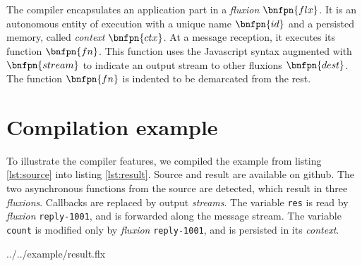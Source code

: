 \vspace{-1\baselineskip}
\begin{bnf*}
      { \bnfor {} \bnfsp {} \bnfsp {}}\\
      { \bnfsp {} \bnfsp {} \bnfsp {} \bnfsp {} \bnfsp {} \bnfsp {}}\\
      { \bnfor {} \bnfor {} \bnfsp {} \bnfsp {}}\\
       { \bnfsp {} }\\
         {}\\
          {\bnfts{\texttt{\{}}  \bnfts{\texttt{\}}}}\\
          {\bnfts{\texttt{[}}  \bnfts{\texttt{]}}}\\
         { \bnfor {} \bnfsp \bnfts{,} \bnfsp {}}\\
           {\bnfts{\texttt{>}\texttt{>}} \bnfor \bnfts{\texttt{-}\texttt{>}}}\\
           {}\\
           {}\\
\end{bnf*}
\vspace{-1.5\baselineskip}~\\
The compiler encapsulates an application part in a \textit{fluxion} $\bnfpn{flx}$.
It is an autonomous entity of execution with a unique name $\bnfpn{id}$ and a persisted memory, called \textit{context} $\bnfpn{ctx}$.
At a message reception, it executes its function $\bnfpn{fn}$.
This function uses the Javascript syntax augmented with $\bnfpn{stream}$ to indicate an output stream to other fluxions $\bnfpn{dest}$.
The function $\bnfpn{fn}$ is indented to be demarcated from the rest.

\section{Compilation example} \label{section:example}

To illustrate the compiler features, we compiled the example from listing \ref{lst:source} into listing \ref{lst:result}.
Source and result are available on github\cite{flx-example}.
The two asynchronous functions from the source are detected, which result in three \textit{fluxions}.
Callbacks are replaced by output \textit{streams}.
The variable \texttt{res} is read by \textit{fluxion} \texttt{reply-1001}, and is forwarded along the message stream.
The variable \texttt{count} is modified only by \textit{fluxion} \texttt{reply-1001}, and is persisted in its \textit{context}.

{../../example/result.flx}

\vfill\eject